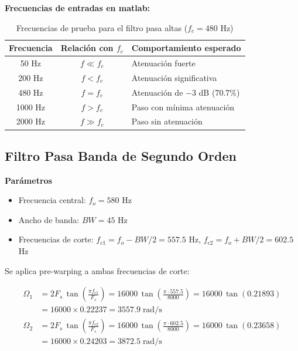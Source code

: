 \textbf{Frecuencias de entradas en matlab:}

\begin{table}[H]
    \centering
    \caption{Frecuencias de prueba para el filtro pasa altas ($f_c = 480$ Hz)}
    \begin{tabular}{|c|c|l|}
        \hline
        \rowcolor{subheadblue}\textbf{Frecuencia} & \textbf{Relación con $f_c$} & \textbf{Comportamiento esperado} \\
        \hline
        50 Hz & $f \ll f_c$ & Atenuación fuerte \\
        \hline
        200 Hz & $f < f_c$ & Atenuación significativa \\
        \hline
        480 Hz & $f = f_c$ & Atenuación de $-3$ dB (70.7\%) \\
        \hline
        1000 Hz & $f > f_c$ & Paso con mínima atenuación \\
        \hline
        2000 Hz & $f \gg f_c$ & Paso sin atenuación \\
        \hline
    \end{tabular}
\end{table}

\subsection{Filtro Pasa Banda de Segundo Orden}

\textbf{Parámetros}

\begin{itemize}
    \item Frecuencia central: $f_o = 580$ Hz
    \item Ancho de banda: $BW = 45$ Hz
    \item Frecuencias de corte: $f_{c1} = f_o - BW/2 = 557.5$ Hz, \quad $f_{c2} = f_o + BW/2 = 602.5$ Hz
\end{itemize}

Se aplica pre-warping a ambas frecuencias de corte:

\begin{align}
    \Omega_1 &= 2F_s\,\tan\!\left(\frac{\pi f_{c1}}{F_s}\right) = 16000\,\tan\!\left(\frac{\pi \cdot 557.5}{8000}\right) = 16000\,\tan(0.21893) \\[4pt]
    &= 16000 \times 0.22237 = 3557.9 \;\text{rad/s} \\[8pt]
    \Omega_2 &= 2F_s\,\tan\!\left(\frac{\pi f_{c2}}{F_s}\right) = 16000\,\tan\!\left(\frac{\pi \cdot 602.5}{8000}\right) = 16000\,\tan(0.23658) \\[4pt]
    &= 16000 \times 0.24203 = 3872.5 \;\text{rad/s}
\end{align}

